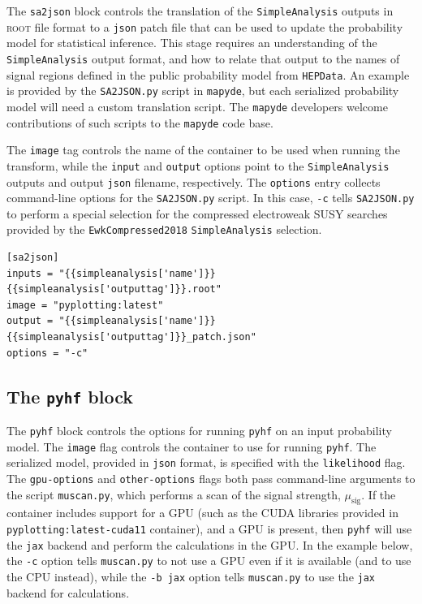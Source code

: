 \documentclass{article}
\newcommand{\mapyde}{\texttt{mapyde}}
\newcommand{\simpleanalysis}{\texttt{SimpleAnalysis}}
\newcommand{\pyhf}{\texttt{pyhf}}
\newcommand{\musig}{\ensuremath{\mu_{\mathrm{sig}}}}
\newcommand{\hepdata}{\texttt{HEPData}}
\newcommand{\ROOT}{\textsc{root}}
\newcommand{\json}{\texttt{json}}
\newcommand{\toml}{\textsc{toml}}
\begin{document}
The \texttt{sa2json} block controls the translation of the \simpleanalysis{} outputs in \ROOT{} file format to a \json{} patch file that can be used to update the probability model for statistical inference.  This stage requires an understanding of the \simpleanalysis{} output format, and how to relate that output to the names of signal regions defined in the public probability model from \hepdata.  An example is provided by the \texttt{SA2JSON.py} script in \mapyde, but each serialized probability model will need a custom translation script.  The \mapyde{} developers welcome contributions of such scripts to the \mapyde{} code base.

The \texttt{image} tag controls the name of the container to be used when running the transform, while the \texttt{input} and \texttt{output} options point to the \simpleanalysis{} outputs and output \json{} filename, respectively.  The \texttt{options} entry collects command-line options for the \texttt{SA2JSON.py} script.  In this case, \texttt{-c} tells \texttt{SA2JSON.py} to perform a special selection for the compressed electroweak SUSY searches provided by the \texttt{EwkCompressed2018} \simpleanalysis{} selection.

\begin{listing}[H]
	\begin{verbatim}
[sa2json]
inputs = "{{simpleanalysis['name']}}{{simpleanalysis['outputtag']}}.root"
image = "pyplotting:latest"
output = "{{simpleanalysis['name']}}{{simpleanalysis['outputtag']}}_patch.json"
options = "-c"
        \end{verbatim}
	\caption{The \texttt{sa2json} block of an example \toml{} configuration file for generating slepton events.}
	\label{slepton-config-sa2json}
\end{listing}

\subsection{The \texttt{pyhf} block}
\label{ssec:the-pyhf-block}

The \texttt{pyhf} block controls the options for running \pyhf{} on an input probability model.  The \texttt{image} flag controls the container to use for running \pyhf.  The serialized model, provided in \json{} format, is specified with the \texttt{likelihood} flag.  The \texttt{gpu-options} and \texttt{other-options} flags both pass command-line arguments to the script \texttt{muscan.py}, which performs a scan of the signal strength, \musig.  If the container includes support for a GPU (such as the CUDA libraries provided in \texttt{pyplotting:latest-cuda11} container), and a GPU is present, then \pyhf{} will use the \texttt{jax} backend and perform the calculations in the GPU.  In the example below, the \texttt{-c} option tells \texttt{muscan.py} to not use a GPU even if it is available (and to use the CPU instead), while the \texttt{-b jax} option tells \texttt{muscan.py} to use the \texttt{jax} backend for calculations.
\end{document}
